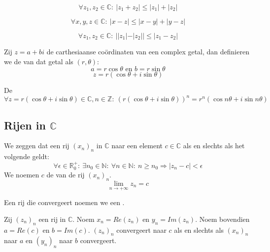 \documentclass[main.tex]{subfiles}
\begin{document}
\begin{pr}
  \[ \forall z_{1},z_{2}\in \mathbb{C}:\ |z_{1}+z_{2}| \le |z_{1}|+|z_{2}| \]
\end{pr}

\begin{pr}
  \[ \forall x,y,z\in \mathbb{C}:\ |x-z| \le |x-y| + |y-z| \]
\end{pr}

\begin{pr}
  \[ \forall z_{1},z_{2}\in \mathbb{C}:\ ||z_{1}|-|z_{2}|| \le |z_{1}-z_{2}| \]
\end{pr}

\begin{de}
  Zij $z = a+bi$ de carthesiaanse co\"ordinaten van een complex getal, dan definieren we de  van dat getal als $(r,\theta)$:
  \[ a = r \cos \theta \text{ en } b = r\sin \theta \]
  \[ z = r(\cos \theta + i \sin \theta)  \]
\end{de}

\begin{st}
  De \\
  \[ \forall z = r(\cos \theta + i \sin \theta) \in \mathbb{C}, n\in \mathbb{Z}:\ (r(\cos \theta + i \sin \theta))^{n} = r^{n}(\cos n\theta + i \sin n\theta)\]
\end{st}



\subsection{Rijen in $\mathbb{C}$}
\label{sec:rijen-mathbbc}

\begin{de}
  We zeggen dat een rij $(x_{n})_{n}$ in $\mathbb{C}$  naar een element $c\in \mathbb{C}$ als en slechts als het volgende geldt:
  \[ \forall \epsilon \in \mathbb{R}_{0}^{+}:\ \exists n_{0}\in \mathbb{N}:\ \forall n\in \mathbb{N}:\ n \ge n_{0} \Rightarrow |z_{n}-c| < \epsilon \]
  We noemen $c$ de  van de rij $(x_{n})_{n}$.
  \[ \lim_{n\rightarrow +\infty}z_{n} = c \]
\end{de}

\begin{de}
  Een rij die convergeert noemen we een .
\end{de}

\begin{pr}
  Zij $(z_{n})_{n}$ een rij in $\mathbb{C}$.
  Noem $x_{n} = Re(z_{n})$ en $y_{n} = Im(z_{n})$.
  Noem bovendien $a=Re(c)$ en $b=Im(c)$.
  $(z_{n})_{n}$ convergeert naar $c$ als en slechts als $(x_{n})_{n}$ naar $a$ en $(y_{n})_{n}$ naar $b$ convergeert.
\end{pr}
\end{document}
